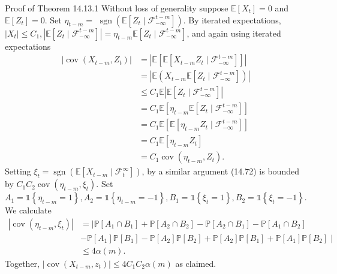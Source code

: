 \documentclass[10pt]{article}
\begin{document}
Proof of Theorem 14.13.1 Without loss of generality suppose $\mathbb{E}\left[X_{t}\right]=0$ and $\mathbb{E}\left[Z_{t}\right]=0$. Set $\eta_{t-m}=$ $\operatorname{sgn}\left(\mathbb{E}\left[Z_{t} \mid \mathscr{F}_{-\infty}^{t-m}\right]\right)$. By iterated expectations, $\left|X_{t}\right| \leq C_{1},\left|\mathbb{E}\left[Z_{t} \mid \mathscr{F}_{-\infty}^{t-m}\right]\right|=\eta_{t-m} \mathbb{E}\left[Z_{t} \mid \mathscr{F}_{-\infty}^{t-m}\right]$, and again using iterated expectations
$$
\begin{aligned}
\left|\operatorname{cov}\left(X_{t-m}, Z_{t}\right)\right| &=\left|\mathbb{E}\left[\mathbb{E}\left[X_{t-m} Z_{t} \mid \mathscr{F}_{-\infty}^{t-m}\right]\right]\right| \\
&=\left|\mathbb{E}\left(X_{t-m} \mathbb{E}\left[Z_{t} \mid \mathscr{F}_{-\infty}^{t-m}\right]\right)\right| \\
& \leq C_{1} \mathbb{E}\left|\mathbb{E}\left[Z_{t} \mid \mathscr{F}_{-\infty}^{t-m}\right]\right| \\
&=C_{1} \mathbb{E}\left[\eta_{t-m} \mathbb{E}\left[Z_{t} \mid \mathscr{F}_{-\infty}^{t-m}\right]\right] \\
&=C_{1} \mathbb{E}\left[\mathbb{E}\left[\eta_{t-m} Z_{t} \mid \mathscr{F}_{-\infty}^{t-m}\right]\right] \\
&=C_{1} \mathbb{E}\left[\eta_{t-m} Z_{t}\right] \\
&=C_{1} \operatorname{cov}\left(\eta_{t-m}, Z_{t}\right) .
\end{aligned}
$$
Setting $\xi_{t}=\operatorname{sgn}\left(\mathbb{E}\left[X_{t-m} \mid \mathscr{F}_{t}^{\infty}\right]\right)$, by a similar argument (14.72) is bounded by $C_{1} C_{2} \operatorname{cov}\left(\eta_{t-m}, \xi_{t}\right)$. Set $A_{1}=\mathbb{1}\left\{\eta_{t-m}=1\right\}, A_{2}=\mathbb{1}\left\{\eta_{t-m}=-1\right\}, B_{1}=\mathbb{1}\left\{\xi_{t}=1\right\}, B_{2}=\mathbb{1}\left\{\xi_{t}=-1\right\}$. We calculate
$$
\begin{aligned}
\left|\operatorname{cov}\left(\eta_{t-m}, \xi_{t}\right)\right| &=\mid \mathbb{P}\left[A_{1} \cap B_{1}\right]+\mathbb{P}\left[A_{2} \cap B_{2}\right]-\mathbb{P}\left[A_{2} \cap B_{1}\right]-\mathbb{P}\left[A_{1} \cap B_{2}\right] \\
&-\mathbb{P}\left[A_{1}\right] \mathbb{P}\left[B_{1}\right]-\mathbb{P}\left[A_{2}\right] \mathbb{P}\left[B_{2}\right]+\mathbb{P}\left[A_{2}\right] \mathbb{P}\left[B_{1}\right]+\mathbb{P}\left[A_{1}\right] \mathbb{P}\left[B_{2}\right] \mid \\
& \leq 4 \alpha(m) .
\end{aligned}
$$
Together, $\left|\operatorname{cov}\left(X_{t-m}, z_{t}\right)\right| \leq 4 C_{1} C_{2} \alpha(m)$ as claimed.
\end{document}

